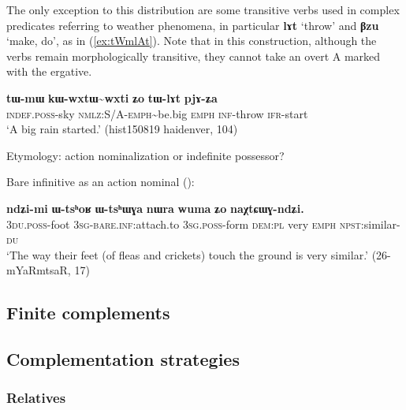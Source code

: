 \documentclass[oldfontcommands,oneside,a4paper,11pt]{article}
\newcommand{\ipa}[1]{\textbf{\phon#1}} %
\newcommand{\tld}{\textasciitilde{}}
\begin{document}
The only exception to this distribution are some transitive verbs used in complex predicates referring to weather phenomena, in particular \ipa{lɤt} `throw' and \ipa{βzu} `make, do', as in (\ref{ex:tWmlAt}). Note that in this construction, although the verbs remain morphologically transitive, they cannot take an overt A marked with the ergative.
 
\begin{exe}
\ex  \label{ex:tWmlAt}
\gll
\ipa{tɯ-mɯ} 	\ipa{kɯ-wxtɯ\tld{}wxti} 	\ipa{ʑo} 	\ipa{tɯ-lɤt} 	\ipa{pjɤ-ʑa} \\
\textsc{indef.poss}-sky \textsc{nmlz:S/A-emph}\tld{}be.big \textsc{emph} \textsc{inf}-throw \textsc{ifr}-start \\
\glt `A big rain started.' (hist150819 haidenver, 104)
\end{exe}



Etymology: action nominalization or indefinite possessor?

Bare infinitive as an action nominal (\citealt{jacques14antipassive}):

\begin{exe}
\ex \label{ex:bare.inf.noun}
\gll \ipa{ndʑi-mi}   	\ipa{ɯ-tsʰoʁ}   	\ipa{ɯ-tsʰɯɣa}   	\ipa{nɯra}   	\ipa{wuma}   	\ipa{ʑo}   	\ipa{naχtɕɯɣ-ndʑi.}   \\
\textsc{3du.poss}-foot \textsc{3sg}-\textsc{bare.inf:}attach.to \textsc{3sg.poss}-form \textsc{dem:pl} very \textsc{emph}  \textsc{npst}:similar-\textsc{du}  \\
\glt `The way their feet (of fleas and crickets) touch the ground is very similar.' (26-mYaRmtsaR, 17)
\end{exe}
 
 
 
 \subsection{Finite complements} 

 

 \subsection{Complementation strategies}  
 
  \subsubsection{Relatives}  
  
\end{document}

